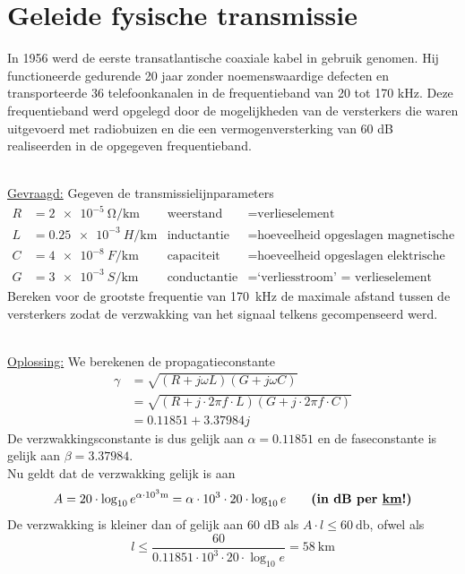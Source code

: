 \documentclass{kuburgiearticle}
\begin{document}
	\newpage

	\section{Geleide fysische transmissie}

	In 1956 werd de eerste transatlantische coaxiale kabel in gebruik genomen. Hij functioneerde gedurende 20 jaar zonder noemenswaardige defecten en transporteerde 36 telefoonkanalen in de frequentieband van 20 tot 170 kHz. Deze frequentieband werd opgelegd door de mogelijkheden van de versterkers die waren uitgevoerd met radiobuizen en die een vermogenversterking van 60 dB realiseerden in de opgegeven frequentieband.

	\hfill \\
	\underline{Gevraagd:}
	Gegeven de transmissielijnparameters \begin{align*}
			R &= \SI{2e-5}{\ohm/\kilo\meter} &\text{weerstand}\ &= \text{verlieselement} \\
			L &= \SI{0.25e-3}{H/\kilo\meter} &\text{inductantie} &= \text{hoeveelheid opgeslagen magnetische energie} \\
			C &= \SI{4e-8}{F/\kilo\meter} &\text{capaciteit} &= \text{hoeveelheid opgeslagen elektrische energie} \\
			G &= \SI{3e-3}{S/\kilo\meter} &\text{conductantie} &= \text{`verliesstroom' = verlieselement}
		\end{align*} Bereken voor de grootste frequentie van \SI{170}{\kilo\hertz} de maximale afstand tussen de versterkers zodat de verzwakking van het signaal telkens gecompenseerd werd.

	\hfill \\
	\underline{Oplossing:}
	We berekenen de propagatieconstante \begin{align*}
		\gamma &= \sqrt{(R+j\omega L)(G+j\omega C)} \\
				&= \sqrt{(R+j \cdot 2\pi f \cdot L)(G+j \cdot 2\pi f \cdot C)} \\
				&= 0.11851 + 3.37984j
	\end{align*}
	De verzwakkingsconstante is dus gelijk aan \(\alpha = 0.11851\) en de faseconstante is gelijk aan \(\beta = 3.37984\). \\Nu geldt dat de verzwakking gelijk is aan \[
	A = 20 \cdot \log_{10} e^{\alpha \cdot 10^3 \unit{\meter}}=\alpha \cdot 10^3 \cdot 20 \cdot \log_{10} e \qquad \text{\textbf{(in dB per \underline{km}!)}}\] De verzwakking is kleiner dan of gelijk aan 60 dB als \(A \cdot l \leq \SI{60}{\decibel}\), ofwel als \[l\leq\frac{60}{0.11851\cdot 10^3\cdot 20 \cdot \log_{10} e} = \boxed{\SI{58}{\kilo\meter}}\]
\end{document}
